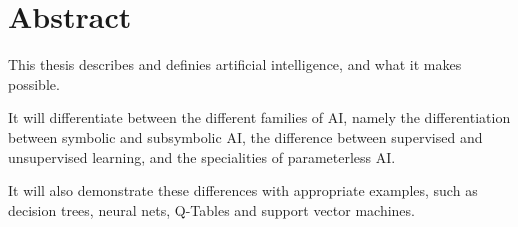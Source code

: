 \chapter*{Abstract}
This thesis describes and definies artificial intelligence, and what it makes possible. 

It will differentiate between the different families of AI, namely the differentiation between symbolic and subsymbolic AI, the difference between supervised and unsupervised learning, and the specialities of parameterless AI.

It will also demonstrate these differences with appropriate examples, such as decision trees, neural nets, Q-Tables and support vector machines.

